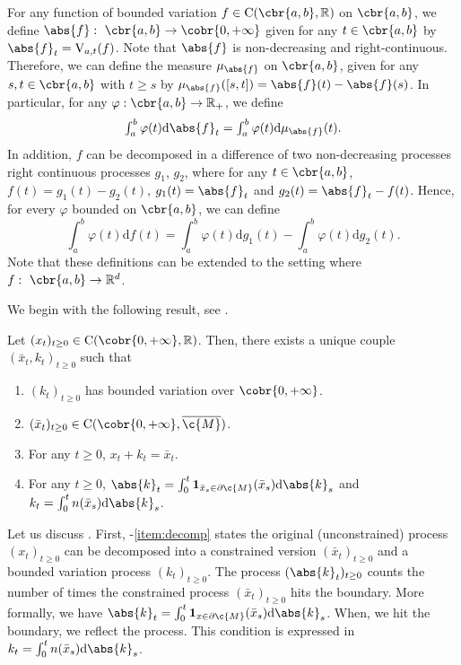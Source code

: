 For any function of bounded variation $f \in \mathrm{C}(\cbr{a,b}, \R)$ on $\cbr{a,b}$, we define $\abs{f}: \ \cbr{a,b} \to \cobr{0,+\infty}$ given for any $t \in \cbr{a,b}$ by $\abs{f}_t = \mathrm{V}_{a,t}(f)$.
Note that $\abs{f}$ is non-decreasing and right-continuous.
Therefore, we can define the measure $\mu_{\abs{f}}$ on $\cbr{a,b}$, given for any $s, t \in \cbr{a,b}$ with $t \geq s$ by $\mu_{\abs{f}}([s,t]) = \abs{f}(t) - \abs{f}(s)$.
In particular, for any $\varphi: \cbr{a,b} \to \R_+$, we define \begin{equation} \textstyle \int_a^b \varphi(t) \mathrm{d} \abs{f}_t = \int_a^b \varphi(t) \mathrm{d} \mu_{\abs{f}}(t) .
\end{equation}
In addition, $f$ can be decomposed in a difference of two non-decreasing processes right continuous processes $g_1$, $g_2$, where for any $t \in \cbr{a,b}$, $f(t) = g_1(t) - g_2(t)$, $g_1(t) = \abs{f}_t$ and $g_2(t) = \abs{f}_t - f(t)$.
Hence, for every $\varphi$ bounded on $\cbr{a,b}$, we can define \begin{equation} \textstyle \int_a^b \varphi(t) \mathrm{d} f(t) = \int_a^b \varphi(t) \mathrm{d} g_1(t) - \int_a^b \varphi(t) \mathrm{d} g_2(t) .
\end{equation}
Note that these definitions can be extended to the setting where $f: \ \cbr{a,b} \to \R^d$.

We begin with the following result, see \cite{lions1984stochastic}.

\begin{theorem}
	\label{thm:existence_reflected_det}
	Let $(x_t)_{t \geq 0} \in \mathrm{C}(\cobr{0, +\infty}, \R)$.
	Then, there exists a unique couple $(\bar{x}_t, k_t)_{t \geq 0}$ such that \begin{enumerate}[label=(\alph*)] \item $(k_t)_{t \geq 0}$ has bounded variation over $\cobr{0,+\infty}$.
		\item $(\bar{x}_t)_{t \geq 0} \in \mathrm{C}(\cobr{0,+\infty}, \cl{\c{M}})$.
		\item For any $t \geq 0$, $x_t + k_t = \bar{x}_t$. \label{item:decomp}
		\item For any $t \geq 0$,
		      $\abs{k}_t = \int_0^t \mathbf{1}_{\bar{x}_s \in \partial \c{M}}(\bar{x}_s) \mathrm{d} \abs{k}_s$ and
		      $k_t = \int_0^t n(\bar{x}_s) \mathrm{d} \abs{k}_s$.
	\end{enumerate}
\end{theorem}

Let us discuss .
First, -\ref{item:decomp} states the original (unconstrained) process $(x_t)_{t \geq 0}$ can be decomposed into a constrained version $(\bar{x}_t)_{t \geq 0}$ and a bounded variation process $(k_t)_{t \geq 0}$.
The process $(\abs{k}_t)_{t \geq 0}$ counts the number of times the constrained process $(\bar{x}_t)_{t \geq 0}$ hits the boundary.
More formally, we have $\abs{k}_t = \int_0^t \mathbf{1}_{x \in \partial \c{M}}(\bar{x}_s) \mathrm{d} \abs{k}_s$.
When, we hit the boundary, we reflect the process.
This condition is expressed in $k_t = \int_0^t n(\bar{x}_s) \mathrm{d} \abs{k}_s$.

